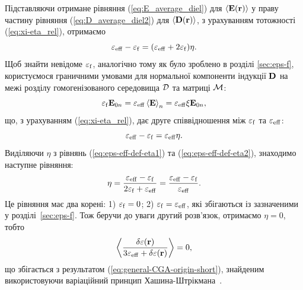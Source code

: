 \documentclass[14pt,twoside]{vakthesis}
\begin{document}
Підставляючи отримане рівняння (\ref{eq:E_average_diel}) для $\langle {\bf E}({\bf r}) \rangle$ у праву частину рівняння (\ref{eq:D_average_diel2}) для $\langle {\bf D}({\bf r}) \rangle$, з урахуванням тотожності (\ref{eq:xi-eta_rel}), отримаємо
\begin{equation}\label{eq:eps-eff-def-eta1}
\varepsilon_{\rm eff} - \varepsilon_{\rm f}
=(\varepsilon_{\rm eff} +2 \varepsilon_{\rm
	f})\eta.
\end{equation}
Щоб знайти невідоме $\varepsilon_{\rm f}$, аналогічно тому як було зроблено в розділі \ref{sec:eps-f}, користуємося граничними умовами для нормальної компоненти індукції $\bf D$ на межі розділу гомогенізованого середовища $\cal{D}$ та матриці ${\cal M}$:
$$
\varepsilon_{\rm f} {\bf E}_{0n}
= \varepsilon_{\rm eff} \left\langle {\bf E} \right\rangle_n = \varepsilon_{\rm eff} \xi {\bf E}_{0n},
$$
що, з урахуванням (\ref{eq:xi-eta_rel}), дає друге співвідношення між $\varepsilon_{\rm f}$ та $\varepsilon_{\rm eff}$:
\begin{equation}\label{eq:eps-eff-def-eta2}
\varepsilon_{\rm eff} - \varepsilon_{\rm f}
= \varepsilon_{\rm eff}\eta.
\end{equation}
Виділяючи $\eta$ з рівнянь (\ref{eq:eps-eff-def-eta1}) та (\ref{eq:eps-eff-def-eta2}), знаходимо наступне рівняння:
\begin{equation}\label{eq:eps_f_rel_homog}
\eta = \frac{\varepsilon_{\rm eff} - \varepsilon_{\rm f}}{2\varepsilon_{\rm f} + \varepsilon_{\rm eff}} = \frac{\varepsilon_{\rm eff} - \varepsilon_{\rm f}}{\varepsilon_{\rm eff}}.
\end{equation}
Це рівняння має два корені: 1) $\varepsilon_{\rm f} = 0$; 2)
$\varepsilon_{\rm f} = \varepsilon_{\rm eff}$, які збігаються із
зазначеними у розділі~\ref{sec:eps-f}. Тож беручи до уваги другий розв'язок, отримаємо $\eta = 0$, тобто
\begin{equation}\label{eq:general_diff}
\left\langle \frac{\delta\varepsilon({\bf r})}{3\varepsilon_{\rm eff} + \delta\varepsilon({\bf r})} \right\rangle = 0,
\end{equation}
що збігається з результатом (\ref{eq:general-CGA-origin-short}), знайденим використовуючи варіаційний принцип Хашина-Штрікмана~\cite{Sushko2017}.
\end{document}
